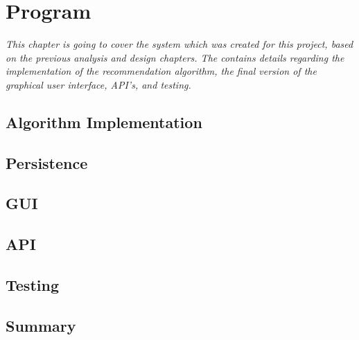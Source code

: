 \chapter{Program}

\textit{This chapter is going to cover the system which was created for this project, based on the previous analysis and design chapters. The contains details regarding the implementation of the recommendation algorithm, the final version of the graphical user interface, API's, and testing.}

\section{Algorithm Implementation}
\label{AlgorithmProg}

\section{Persistence}
\label{Persistence}

\section{GUI}
\label{GUI}

\section{API}
\label{API}

\section{Testing}
\label{Testing}


\section{Summary}
\label{ProSummary}